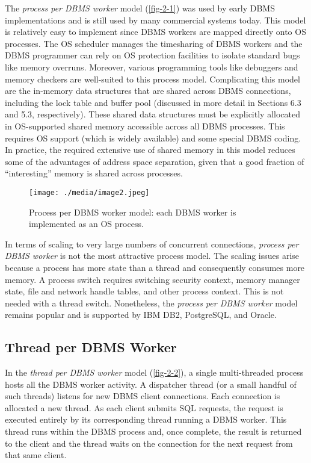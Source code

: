 \documentclass[a4paper,11pt,twoside,openright]{book}
\begin{document}
The \emph{process per DBMS worker} model (\autoref{fig-2-1}) was used by early
DBMS implementations and is still used by many commercial systems today.
This model is relatively easy to implement since DBMS workers are mapped
directly onto OS processes. The OS scheduler manages the timesharing of
DBMS workers and the DBMS programmer can rely on OS protection
facilities to isolate standard bugs like memory overruns. Moreover,
various programming tools like debuggers and memory checkers are
well-suited to this process model. Complicating this model are the
in-memory data structures that are shared across DBMS connections,
including the lock table and buffer pool (discussed in more detail in
Sections 6.3 and 5.3, respectively). These shared data structures must
be explicitly allocated in OS-supported shared memory accessible across
all DBMS processes. This requires OS support (which is widely available)
and some special DBMS coding. In practice, the required extensive use of shared memory in this model reduces some of
the advantages of address space separation, given that a good fraction
of ``interesting'' memory is shared across processes.

\begin{figure}
\centering
\texttt{[image: ./media/image2.jpeg]}

\caption{Process per DBMS worker model: each DBMS worker is implemented
as an OS process.\label{fig-2-1}}
\end{figure}

In terms of scaling to very large numbers of concurrent connections,
\emph{process per DBMS worker} is not the most attractive process model.
The scaling issues arise because a process has more state than a thread
and consequently consumes more memory. A process switch requires
switching security context, memory manager state, file and network
handle tables, and other process context. This is not needed with a
thread switch. Nonetheless, the \emph{process per DBMS worker} model
remains popular and is supported by IBM DB2, PostgreSQL, and Oracle.

\hypertarget{thread-per-dbms-worker}{%
\subsection{Thread per DBMS Worker}\label{thread-per-dbms-worker}}

In the \emph{thread per DBMS worker} model (\autoref{fig-2-2}), a single
multi-threaded process hosts all the DBMS worker activity. A dispatcher
thread (or a small handful of such threads) listens for new DBMS client
connections. Each connection is allocated a new thread. As each client
submits SQL requests, the request is executed entirely by its
corresponding thread running a DBMS worker. This thread runs within the
DBMS process and, once complete, the result is returned to the client
and the thread waits on the connection for the next request from that
same client.
\end{document}
